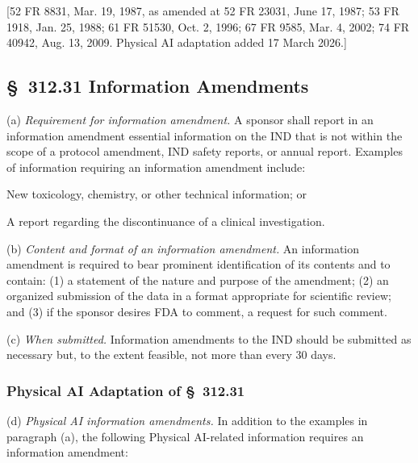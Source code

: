 \documentclass[11pt]{article}
\begin{document}
[52 FR 8831, Mar. 19, 1987, as amended at 52 FR 23031, June 17, 1987; 53 FR 1918, Jan. 25, 1988; 61 FR 51530, Oct. 2, 1996; 67 FR 9585, Mar. 4, 2002; 74 FR 40942, Aug. 13, 2009. Physical AI adaptation added 17 March 2026.]

\subsection{\S~312.31 Information Amendments}

(a) \textit{Requirement for information amendment.} A sponsor shall report in an information amendment essential information on the IND that is not within the scope of a protocol amendment, IND safety reports, or annual report. Examples of information requiring an information amendment include:

\begin{description}[leftmargin=0.5cm,style=sameline]
\item[(1)] New toxicology, chemistry, or other technical information; or
\item[(2)] A report regarding the discontinuance of a clinical investigation.
\end{description}

(b) \textit{Content and format of an information amendment.} An information amendment is required to bear prominent identification of its contents and to contain: (1) a statement of the nature and purpose of the amendment; (2) an organized submission of the data in a format appropriate for scientific review; and (3) if the sponsor desires FDA to comment, a request for such comment.

(c) \textit{When submitted.} Information amendments to the IND should be submitted as necessary but, to the extent feasible, not more than every 30 days.

\subsubsection{Physical AI Adaptation of \S~312.31}

(d) \textit{Physical AI information amendments.} In addition to the examples in paragraph (a), the following Physical AI-related information requires an information amendment:
\end{document}
